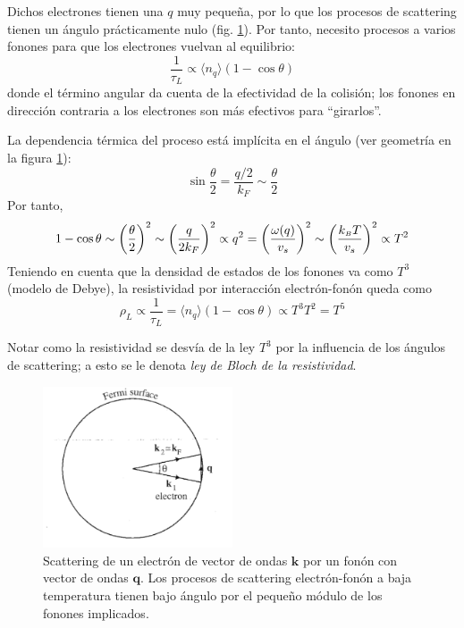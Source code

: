 Dichos electrones tienen una $q$ muy pequeña, por lo que los procesos de
scattering tienen un ángulo prácticamente nulo
(fig. \ref{fig:smalltheta}). Por tanto, necesito procesos a varios
fonones para que los electrones vuelvan al equilibrio:
\begin{equation}
  \frac{1}{\tau_L} \propto \langle n_q \rangle (1-\cos \theta)
\end{equation}
donde el término angular da cuenta de la efectividad de la colisión;
los fonones en dirección contraria a los electrones son más efectivos
para ``girarlos''.

La dependencia térmica del proceso está implícita en el ángulo (ver
geometría en la figura \ref{fig:smalltheta}):
\begin{equation}
  \sin \frac{\theta}{2} = \frac{q/2}{k_F} \sim \frac{\theta}{2}
\end{equation}
Por tanto,
\begin{equation}
  1 - \cos \theta \sim \left( \frac{\theta}{2} \right)^2 \sim \left(
    \frac{q}{2k_F} \right) ^2 \propto q^2 = \left(
    \frac{\omega(q)}{v_s} \right)^2 \sim \left( \frac{k_{\scriptscriptstyle{B}}  T}{v_s}
  \right) ^2 \propto T^2
\end{equation}
Teniendo en cuenta que la densidad de estados de los fonones va como $T^3$ (modelo de
Debye), la resistividad por interacción electrón-fonón queda como
\begin{equation}
\label{eq:t5}
  \rho_L \propto \frac{1}{\tau_L} = \langle n_q \rangle (1 - \cos
  \theta) \propto T^3 T^2 = T^5
\end{equation}

Notar como la resistividad se desvía de la ley $T^3$ por la influencia
de los ángulos de scattering; a esto se le denota \emph{ley de Bloch
  de la resistividad}.

\begin{figure}
  \centering
  \includegraphics[width=0.5\textwidth]{figures/smalltheta.png}
  \caption{Scattering de un electrón de vector de ondas $\mathbf{k}$
    por un fonón con vector de ondas $\mathbf{q}$. Los procesos de scattering electrón-fonón a baja
    temperatura tienen bajo ángulo por el pequeño módulo de los
    fonones implicados.}
  \label{fig:smalltheta}
\end{figure}


